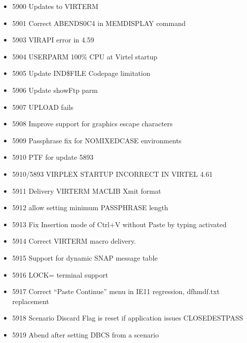 \documentclass[letterpaper,10pt,english]{sphinxmanual}
\begin{document}
\begin{itemize}
\item {} 
5900 Updates to VIRTERM

\item {} 
5901 Correct ABENDS0C4 in MEMDISPLAY command

\item {} 
5903 VIRAPI error in 4.59

\item {} 
5904 USERPARM 100\% CPU at Virtel startup

\item {} 
5905 Update IND\$FILE Codepage limitation

\item {} 
5906 Update showFtp parm

\item {} 
5907 UPLOAD fails

\item {} 
5908 Improve support for graphics escape characters

\item {} 
5909 Passphrase fix for NOMIXEDCASE environments

\item {} 
5910 PTF for update 5893

\item {} 
5910/5893 VIRPLEX STARTUP INCORRECT IN VIRTEL 4.61

\item {} 
5911 Delivery VIRTERM MACLIB Xmit format

\item {} 
5912 allow setting minimum PASSPHRASE length

\item {} 
5913 Fix Insertion mode of Ctrl+V without Paste by typing activated

\item {} 
5914 Correct VIRTERM macro delivery.

\item {} 
5915 Support for dynamic SNAP message table

\item {} 
5916 LOCK= terminal support

\item {} 
5917 Correct “Paste Continue” menu in IE11 regression, dfhmdf.txt replacement

\item {} 
5918 Scenario Discard Flag is reset if application issues CLOSEDESTPASS

\item {} 
5919 Abend after setting DBCS from a scenario


\end{itemize}
\end{document}
